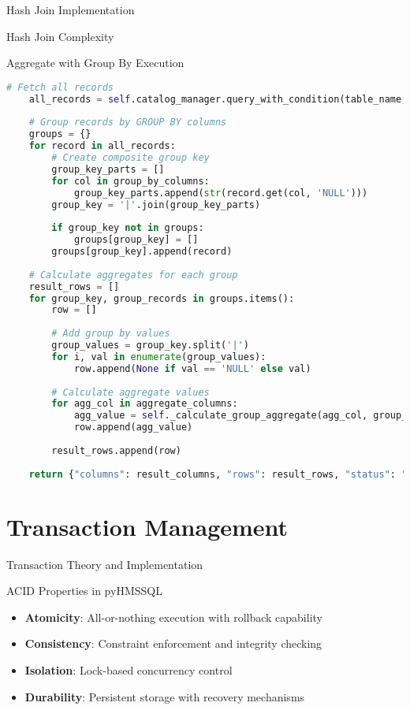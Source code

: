 \documentclass[aspectratio=169]{beamer}
\begin{document}
\begin{frame}{Hash Join Implementation}
\begin{block}{Hash Join Complexity}
\begin{frame}[fragile]{Aggregate with Group By Execution}
\begin{lstlisting}[language=Python]
    # Fetch all records
    all_records = self.catalog_manager.query_with_condition(table_name, [], ["*"])
    
    # Group records by GROUP BY columns
    groups = {}
    for record in all_records:
        # Create composite group key
        group_key_parts = []
        for col in group_by_columns:
            group_key_parts.append(str(record.get(col, 'NULL')))
        group_key = '|'.join(group_key_parts)
        
        if group_key not in groups:
            groups[group_key] = []
        groups[group_key].append(record)
    
    # Calculate aggregates for each group
    result_rows = []
    for group_key, group_records in groups.items():
        row = []
        
        # Add group by values
        group_values = group_key.split('|')
        for i, val in enumerate(group_values):
            row.append(None if val == 'NULL' else val)
        
        # Calculate aggregate values
        for agg_col in aggregate_columns:
            agg_value = self._calculate_group_aggregate(agg_col, group_records)
            row.append(agg_value)
        
        result_rows.append(row)
    
    return {"columns": result_columns, "rows": result_rows, "status": "success"}
\end{lstlisting}
\end{frame}

\section{Transaction Management}

\begin{frame}{Transaction Theory and Implementation}
\begin{block}{ACID Properties in pyHMSSQL}
\begin{itemize}
    \item \textbf{Atomicity}: All-or-nothing execution with rollback capability
    \item \textbf{Consistency}: Constraint enforcement and integrity checking
    \item \textbf{Isolation}: Lock-based concurrency control
    \item \textbf{Durability}: Persistent storage with recovery mechanisms
\end{itemize}
\end{block}


\end{frame}
\end{block}
\end{frame}
\end{document}

